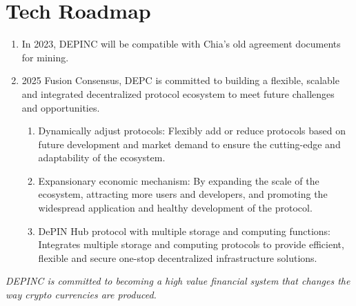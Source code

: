 \chapter{Tech Roadmap}
\begin{enumerate}
    \item In 2023, DEPINC will be compatible with Chia's old agreement documents for mining.
    \item 2025 Fusion Consensus, DEPC is committed to building a flexible, scalable and integrated decentralized protocol ecosystem to meet future challenges and opportunities.
    \begin{enumerate}
        \item Dynamically adjust protocols: Flexibly add or reduce protocols based on future development and market demand to ensure the cutting-edge and adaptability of the ecosystem.
        \item Expansionary economic mechanism: By expanding the scale of the ecosystem, attracting more users and developers, and promoting the widespread application and healthy development of the protocol.
        \item DePIN Hub protocol with multiple storage and computing functions: Integrates multiple storage and computing protocols to provide efficient, flexible and secure one-stop decentralized infrastructure solutions.
    \end{enumerate}
\end{enumerate}
\bigskip
\begin{flushleft}
    \textit{DEPINC is committed to becoming a high value financial system that changes the way crypto currencies are produced.}
\end{flushleft}

